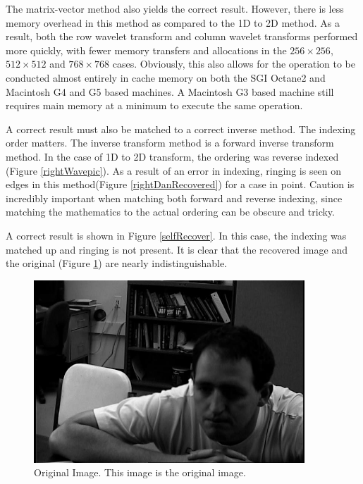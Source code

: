 The matrix-vector method also yields the correct result.  However, there is less memory overhead in this method as compared to the 1D to 2D method.  As a result, both the row wavelet transform and column wavelet transforms performed more quickly, with fewer memory transfers and allocations in the $256\times 256$, $512\times 512$ and $768 \times 768$ cases.  Obviously, this also allows for the operation to be conducted almost entirely in cache memory on both the SGI Octane2 and Macintosh G4 and G5 based machines.  A Macintosh G3 based machine still requires main memory at a minimum to execute the same operation.%

A correct result must also be matched to a correct inverse method.  The indexing order matters.  The inverse transform method is a forward inverse transform method.  In the case of 1D to 2D transform, the ordering was reverse indexed (Figure \ref{rightWavepic}).  As a result of an error in indexing, ringing is seen on edges in this method(Figure \ref{rightDanRecovered}) for a case in point.  Caution is incredibly important when matching both forward and reverse indexing, since matching the mathematics to the actual ordering can be obscure and tricky.   

A correct result is shown in Figure \ref{selfRecover}.  In this case, the indexing was matched up and ringing is not present.  It is clear that the recovered image and the original (Figure \ref{rightDan}) are nearly indistinguishable.  

\begin{figure}[htb]
\begin{center}
\includegraphics [width=4in]{rightDan.jpg}
\end{center}
\caption{Original Image.  This image is the original image. }
\label{rightDan}
\end{figure}

